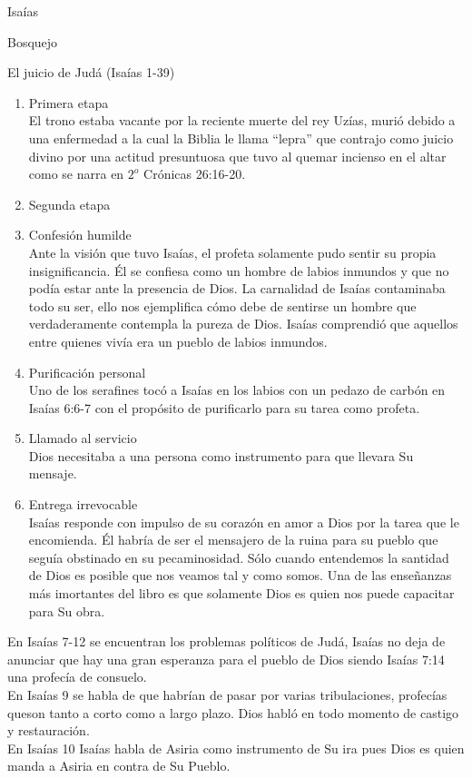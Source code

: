 \begin{section}{Isaías}
\begin{subsection}{Bosquejo}
\begin{subsubsection}{El juicio de Judá (Isaías 1-39)}
\begin{itemize}
\begin{enumerate}
	\item Primera etapa\\
		El trono estaba vacante por la reciente muerte del rey Uzías, murió debido a una enfermedad a la cual la Biblia le llama ``lepra'' que contrajo como juicio divino por una actitud presuntuosa que tuvo al quemar incienso en el altar como se narra en $2^{o}$ Crónicas 26:16-20.
	\item Segunda etapa
	\item Confesión humilde\\
Ante la visión que tuvo Isaías, el profeta solamente pudo sentir su propia insignificancia. Él se confiesa como un hombre de labios inmundos y que no podía estar ante la presencia de Dios. La carnalidad de Isaías contaminaba todo su ser, ello nos ejemplifica cómo debe de sentirse un hombre que verdaderamente contempla la pureza de Dios. Isaías comprendió que aquellos entre quienes vivía era un pueblo de labios inmundos.\\
\item Purificación personal\\
	Uno de los serafines tocó a Isaías en los labios con un pedazo de carbón en Isaías 6:6-7 con el propósito de purificarlo para su tarea como profeta.
\item Llamado al servicio\\
	Dios necesitaba a una persona como instrumento para que llevara Su mensaje.
\item Entrega irrevocable\\
	Isaías responde con impulso de su corazón en amor a Dios por la tarea que le encomienda. Él habría de ser el mensajero de la ruina para su pueblo que seguía obstinado en su pecaminosidad. Sólo cuando entendemos la santidad de Dios es posible que nos veamos tal y como somos. Una de las enseñanzas más imortantes del libro es que solamente Dios es quien nos puede capacitar para Su obra.
\end{enumerate}
En Isaías 7-12 se encuentran los problemas políticos de Judá, Isaías no deja de anunciar que hay una gran esperanza para el pueblo de Dios siendo Isaías 7:14 una profecía de consuelo.\\
En Isaías 9 se habla de que habrían de pasar por varias tribulaciones, profecías queson tanto a corto como a largo plazo. Dios habló en todo momento de castigo y restauración.\\
En Isaías 10 Isaías habla de Asiria como instrumento de Su ira pues Dios es quien manda a Asiria en contra de Su Pueblo. 

\end{itemize}
\end{subsubsection}
\end{subsection}
\end{section}
